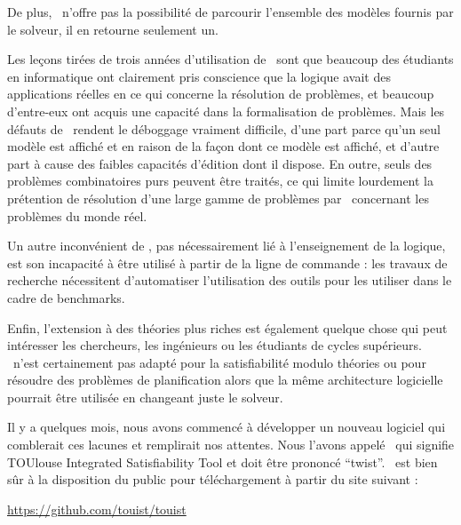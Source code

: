 De plus, \satoulouse\ n'offre pas la possibilité de parcourir l'ensemble des modèles fournis par le solveur, il en retourne seulement un.






\color{red}
Les leçons tirées de trois années d'utilisation de \satoulouse\ sont que beaucoup des étudiants en informatique ont clairement pris conscience que la logique avait des applications réelles en ce qui concerne la résolution de problèmes, et beaucoup d'entre-eux ont acquis une capacité dans la formalisation de problèmes. Mais les défauts de \satoulouse\ rendent le déboggage vraiment difficile, d'une part parce qu'un seul modèle est affiché et en raison de la façon dont ce modèle est affiché, et d'autre part à cause des faibles capacités d'édition dont il dispose. En outre, seuls des problèmes combinatoires purs peuvent être traités, ce qui limite lourdement la prétention de résolution d'une large gamme de problèmes par \satoulouse\ concernant les problèmes du monde réel.

Un autre inconvénient de \satoulouse, pas nécessairement lié à l'enseignement de la logique, est son incapacité à être utilisé à partir de la ligne de commande : les travaux de recherche nécessitent d'automatiser l'utilisation des outils pour les utiliser dans le cadre de benchmarks.

Enfin, l'extension à des théories plus riches est également quelque chose qui peut intéresser les chercheurs, les ingénieurs ou les étudiants de cycles supérieurs. \satoulouse\ n'est certainement pas adapté pour la satisfiabilité modulo théories ou pour résoudre des problèmes de planification alors que la même architecture logicielle pourrait être utilisée en changeant juste le solveur.


Il y a quelques mois, nous avons commencé à développer un nouveau logiciel qui comblerait ces lacunes et remplirait nos attentes. Nous l'avons appelé \touist\ qui signifie TOUlouse Integrated Satisfiability Tool et doit être prononcé ``twist''.
 \touist\ est bien sûr à la disposition du public pour téléchargement à partir du site suivant :
\begin{center}\url{ https://github.com/touist/touist }\end{center}
\color{black}

